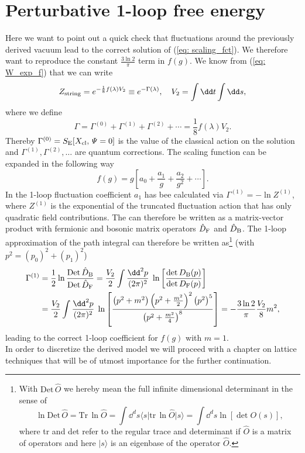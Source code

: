 \section{Perturbative 1-loop free energy}
Here we want to point out a quick check that fluctuations around the previously derived vacuum lead to the correct solution of (\ref{eq: scaling_fct}). We therefore want to reproduce the constant $\frac{3\ln 2}{\pi}$ term in $f(g)$. We know from (\ref{eq: W_exp_f}) that we can write
%
%
\begin{equation}
Z_{\rm string} = e^{-\frac{1}{8}f(\lambda)V_{2}} \equiv e^{-\Gamma(\lambda)}, \quad V_{2}=\int \dd t \int \dd s,
\end{equation}
%
%
where we define
%
%
\begin{equation}
\Gamma = \Gamma^{(0)} + \Gamma^{(1)}+\Gamma^{(2)}+\cdots = \frac{1}{8}f(\lambda)V_{2}.
\end{equation}
%
%
Thereby $\Gamma^{(0)}=S_{\rm E}[X_{\rm cl},\mathit{\Psi}=0]$ is the value of the classical action on the solution and $\Gamma^{(1)},\Gamma^{(2)},\ldots$ are quantum corrections. The scaling function can be expanded in the following way
%
%
\begin{equation}
f(g) = g \left[ a_{0} + \frac{a_{1}}{g} + \frac{a_{2}}{g^{2}} + \cdots \right].
\end{equation}
%
%
In \cite{Giombi:2009gd} the 1-loop fluctuation coefficient $a_{1}$ has bee calculated via $\Gamma^{(1)}=-\ln Z^{(1)}$, where $Z^{(1)}$ is the exponential of the truncated fluctuation action that has only quadratic field contributions. The  can therefore be written as a matrix-vector product with fermionic and bosonic matrix operators $\hat{D}_{\rm F}$ and $\hat{D}_{\rm B}$. The 1-loop approximation of the path integral can therefore be written as\footnote{With $\text{Det}\,\hat{O}$ we hereby mean the full infinite dimensional determinant in the sense of
\begin{equation*}
\ln \text{Det}\,\hat{O} = \text{Tr}\,\ln \hat{O} = \int \dd^{d}s \langle s\vert \text{tr}\,\ln\hat{O} \vert s \rangle
=\int \dd^{d}s \ln[\det O(s) ] ,
\end{equation*}
where tr and det refer to the regular trace and determinant if $\hat{O}$ is a matrix of operators and here $\vert s \rangle$ is an eigenbase of the operator $\hat{O}$.} (with $p^{2} = (p_{0})^{2}+(p_{1})^{2}$)
%
%
\begin{align}
\Gamma^{(1)} &= \frac{1}{2} \ln \frac{\text{Det}\, \hat{D}_{\rm B}}{\text{Det}\,\hat{D}_{\rm F}}
=  \frac{V_{2}}{2} \int \frac{\dd^{2}p}{(2\pi)^{2}} \; \ln \left[\frac{\det D_{\rm B}(p)}{\det D_{\rm F}(p)} \right]
\label{eq: 1_loop}      \\
%
%
&= \frac{V_{2}}{2} \int \frac{\dd^{2}p}{(2\pi)^{2}} \; \ln \left[ \frac{\left(p^{2} +m^{2}\right) \left( p^{2} +\frac{m^{2}}{2}\right)^{2} \left(p^{2}\right)^{5}}{\left( p^{2} + \frac{m^{2}}{4}\right)^{8}} \right]
=-\frac{3 \ln 2}{\pi} \frac{V_{2}}{8}m^{2},   \notag
\end{align}
%
%
leading to the correct 1-loop coefficient for $f(g)$ with $m=1$.\\
In order to discretize the derived model we will proceed with a chapter on lattice techniques that will be of utmost importance for the further continuation.
